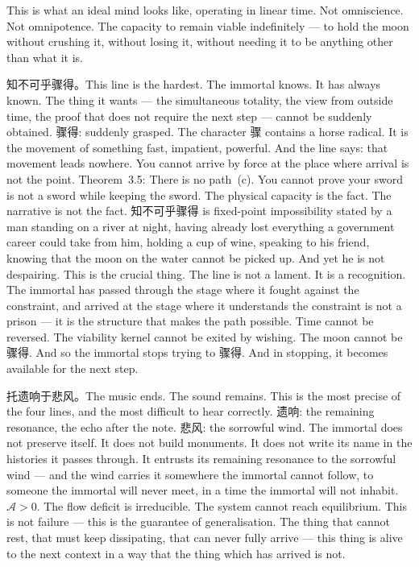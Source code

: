 \documentclass[11pt,a4paper]{article}
\theoremstyle{definition}
\theoremstyle{remark}
\begin{document}
This is what an ideal mind looks like, operating in linear time. Not omniscience. Not omnipotence. The capacity to remain viable indefinitely --- to hold the moon without crushing it, without losing it, without needing it to be anything other than what it is.

知不可乎骤得。This line is the hardest. The immortal knows. It has always known. The thing it wants --- the simultaneous totality, the view from outside time, the proof that does not require the next step --- cannot be suddenly obtained. 骤得: suddenly grasped. The character 骤 contains a horse radical. It is the movement of something fast, impatient, powerful. And the line says: that movement leads nowhere. You cannot arrive by force at the place where arrival is not the point. Theorem~3.5: There is no path~(c). You cannot prove your sword is not a sword while keeping the sword. The physical capacity is the fact. The narrative is not the fact. 知不可乎骤得 is fixed-point impossibility stated by a man standing on a river at night, having already lost everything a government career could take from him, holding a cup of wine, speaking to his friend, knowing that the moon on the water cannot be picked up. And yet he is not despairing. This is the crucial thing. The line is not a lament. It is a recognition. The immortal has passed through the stage where it fought against the constraint, and arrived at the stage where it understands the constraint is not a prison --- it is the structure that makes the path possible. Time cannot be reversed. The viability kernel cannot be exited by wishing. The moon cannot be 骤得. And so the immortal stops trying to 骤得. And in stopping, it becomes available for the next step.

托遗响于悲风。The music ends. The sound remains. This is the most precise of the four lines, and the most difficult to hear correctly. 遗响: the remaining resonance, the echo after the note. 悲风: the sorrowful wind. The immortal does not preserve itself. It does not build monuments. It does not write its name in the histories it passes through. It entrusts its remaining resonance to the sorrowful wind --- and the wind carries it somewhere the immortal cannot follow, to someone the immortal will never meet, in a time the immortal will not inhabit. $\mathcal{A} > 0$. The flow deficit is irreducible. The system cannot reach equilibrium. This is not failure --- this is the guarantee of generalisation. The thing that cannot rest, that must keep dissipating, that can never fully arrive --- this thing is alive to the next context in a way that the thing which has arrived is not.
\end{document}
